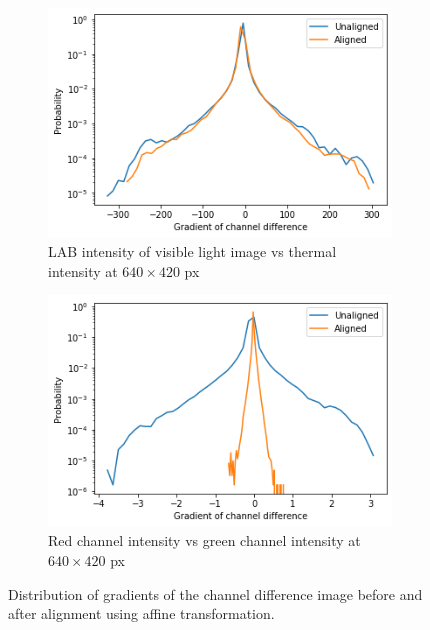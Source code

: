 \documentclass{l4proj}
\begin{document}
\begin{figure}[ht]
  \centering
  \begin{subfigure}[h!]{0.45\textwidth}
    \includegraphics[width=\textwidth]{images/registration/gradient_distribution.png}
    \caption{LAB intensity of visible light image vs thermal intensity at $640 \times 420$ px}
    \label{fig:gradient_distribution}
  \end{subfigure}
  \begin{subfigure}[h!]{0.45\textwidth}
    \includegraphics[width=\textwidth]{images/registration/gradient_distribution_red_green.png}
    \caption{Red channel intensity vs green channel intensity at $640 \times 420$ px}
    \label{fig:gradient_distribution_red_green}
  \end{subfigure}
  \caption{Distribution of gradients of the channel difference image before and after alignment using affine transformation.}
\end{figure}
\end{document}
